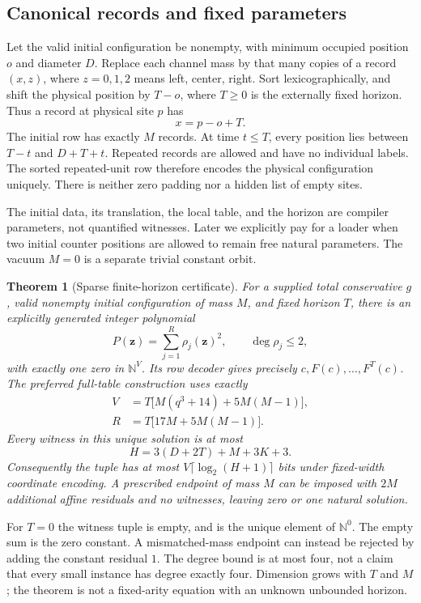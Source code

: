 \documentclass[11pt,letterpaper]{article}
\numberwithin{equation}{section}
\newtheorem{theorem}{Theorem}[section]
\theoremstyle{definition}
\theoremstyle{remark}
\newcommand{\NN}{\mathbb N}
\begin{document}
\subsection{Canonical records and fixed parameters}
Let the valid initial configuration be nonempty, with minimum occupied position $o$ and diameter $D$. Replace each channel mass by that many copies of a record $(x,z)$, where $z=0,1,2$ means left, center, right. Sort lexicographically, and shift the physical position by $T-o$, where $T\ge0$ is the externally fixed horizon. Thus a record at physical site $p$ has
\[
 x=p-o+T.
\]
The initial row has exactly $M$ records. At time $t\le T$, every position lies between $T-t$ and $D+T+t$. Repeated records are allowed and have no individual labels. The sorted repeated-unit row therefore encodes the physical configuration uniquely. There is neither zero padding nor a hidden list of empty sites.

The initial data, its translation, the local table, and the horizon are compiler parameters, not quantified witnesses. Later we explicitly pay for a loader when two initial counter positions are allowed to remain free natural parameters. The vacuum $M=0$ is a separate trivial constant orbit.

\begin{theorem}[Sparse finite-horizon certificate]\label{smc:sl:thm:core}
For a supplied total conservative $g$, valid nonempty initial configuration of mass $M$, and fixed horizon $T$, there is an explicitly generated integer polynomial
\[
 P(\mathbf z)=\sum_{j=1}^{R}\rho_j(\mathbf z)^2,
 \qquad \deg\rho_j\le2,
\]
with exactly one zero in $\NN^V$. Its row decoder gives precisely $c,F(c),\ldots,F^T(c)$. The preferred full-table construction uses exactly
\begin{align}
 V&=T\bigl[M(q^3+14)+5M(M-1)\bigr],\label{smc:sl:eq:V}\\
 R&=T\bigl[17M+5M(M-1)\bigr].\label{smc:sl:eq:R}
\end{align}
Every witness in this unique solution is at most
\begin{equation}\label{smc:sl:eq:H}
 H=3(D+2T)+M+3K+3.
\end{equation}
Consequently the tuple has at most $V\lceil\log_2(H+1)\rceil$ bits under fixed-width coordinate encoding. A prescribed endpoint of mass $M$ can be imposed with $2M$ additional affine residuals and no witnesses, leaving zero or one natural solution.
\end{theorem}

For $T=0$ the witness tuple is empty, and is the unique element of $\NN^0$. The empty sum is the zero constant. A mismatched-mass endpoint can instead be rejected by adding the constant residual $1$. The degree bound is at most four, not a claim that every small instance has degree exactly four. Dimension grows with $T$ and $M$; the theorem is not a fixed-arity equation with an unknown unbounded horizon.
\end{document}
